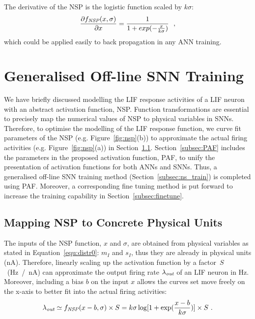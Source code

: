 	The derivative of the NSP is the logistic function scaled by $k\sigma$:
	\begin{equation}
	\frac{\partial f_{\textit{\textrm{NSP}}}(x,\sigma)}{\partial x} = \frac{1}{1+exp(-\frac{x}{k\sigma})}~~,
	\label{equ:logist}
	\end{equation}	
	which could be applied easily to back propagation in any ANN training.	
	
	
\section{Generalised Off-line SNN Training}
\label{sec:genrial_SNN}
	We have briefly discussed modelling the LIF response activities of a LIF neuron with an abstract activation function, NSP.
	Function transformations are essential to precisely map the numerical values of NSP to physical variables in SNNs. 
	Therefore, to optimise the modelling of the LIF response function, we curve fit parameters of the NSP (e.g. Figure~\ref{fig:nsp}(b)) to approximate the actual firing activities (e.g. Figure~\ref{fig:nsp}(a)) in Section~\ref{sec:af_model}.
	Section~\ref{subsec:PAF} includes the parameters in the proposed activation function, PAF, to unify the presentation of activation functions for both ANNs and SNNs.
	Thus, a generalised off-line SNN training method (Section~\ref{subsec:ns_train}) is completed using PAF.
	Moreover, a corresponding fine tuning method is put forward to increase the training capability in Section~\ref{subsec:finetune}.

	
	\subsection{Mapping NSP to Concrete Physical Units}
	\label{sec:af_model}
	The inputs of the NSP function, $x$ and $\sigma$, are obtained from physical variables as stated in Equation~\ref{equ:distr0}: $m_I$ and $s_I$, thus they are already in physical units (nA).
	Therefore, linearly scaling up the activation function by a factor~$S$~(Hz~/~nA) can approximate the output firing rate $\lambda_{\textit{\textrm{out}}}$ of an LIF neuron in Hz.
	Moreover, including a bias $b$ on the input $x$ allows the curves set move freely on the x-axis to better fit into the actual firing activities:
	\begin{equation}
	\lambda_{\textit{\textrm{out}}} \simeq f_{\textit{\textrm{NSP}}}(x-b, \sigma) \times S = k \sigma \log [1 + \exp(\frac{x-b}{k \sigma})] \times S~.
	\label{equ:fit}
	\end{equation}	
	
